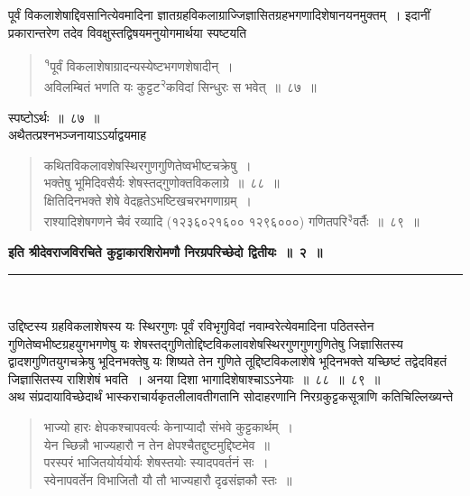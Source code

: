\documentclass[11pt, openany]{book}
\begin{document}
\newpage
\thispagestyle{fancy}
\fancyhf{}
\indent
पूर्वं विकलाशेषाद्दिवसानित्येवमादिना ज्ञातग्रहविकलाग्राज्जिज्ञासितग्रहभगणादिशेषानयनमुक्तम्~। इदानीं प्रकारान्तरेण तदेव विवक्षुस्तद्विषयमनुयोगमार्थया स्पष्टयति\textendash
\begin{quote}
{\ks \textsuperscript{१}पूर्वं विकलाशेषाग्रादन्यस्येष्टभगणशेषादीन्~।\\
अविलम्बितं भणति यः कुट्टट\textsuperscript{२}कविदां सिन्धुरः स भवेत्~॥~८७~॥}
\end{quote}
\indent
स्पष्टोऽर्थः~॥~८७~॥\\
\indent
अथैतत्प्रश्नभञ्जनायाऽऽर्याद्वयमाह\textendash
\begin{quote}
{\ks कथितविकलावशेषस्थिरगुणगुणितेष्वभीष्टचक्रेषु~।\\
भक्तेषु भूमिदिवसैर्यः शेषस्तद्गुणोक्तविकलाग्रे~॥~८८~॥\\
क्षितिदिनभक्ते शेषे वेदहृतेऽभष्टिखचरभगणाग्रम्~।\\
राश्यादिशेषगणने चैवं रव्यादि (१२३६०२१६००\textendash
१२९६०००) गणितपरि\textsuperscript{३}वर्तैः~॥~८९~॥}
\end{quote}
\centering
\textbf{इति श्रीदेवराजविरचिते कुट्टाकारशिरोमणौ निरग्रपरिच्छेदो द्वितीयः~॥~२~॥\\}
\rule{0.2\linewidth}{1.0pt}\\

\vspace{1cm}
\justifying

\indent
उद्दिष्टस्य ग्रहविकलाशेषस्य यः स्थिरगुणः पूर्वं रविभृगुविदां नवाम्वरेत्येवमादिना पठितस्तेन गुणितेष्वभीष्टग्रहयुगभगणेषु यः शेषस्तद्गुणितोद्दिष्टविकलावशेषस्थिरगुणगुणगुणितेषु जिज्ञासितस्य द्वादशगुणितयुगचक्रेषु भूदिनभक्तेषु यः शिष्यते तेन गुणिते तूद्दिष्टविकलाशेषे भूदिनभक्ते यच्छिष्टं तद्वेदविहतं जिज्ञासितस्य राशिशेषं भवति~। अनया दिशा भागादिशेषाश्चाऽऽनेयाः~॥~८८~॥~८९~॥\\
\indent
अथ संप्रदायाविच्छेदार्थं भास्कराचार्यकृतलीलावतीगतानि सोदाहरणानि
निरग्रकुट्टकसूत्राणि कतिचिल्लिख्यन्ते\textendash
\hspace{1cm}
\begin{quote}
{\qt 
भाज्यो हारः क्षेपकश्चापवर्त्यः केनाप्यादौ संभवे कुट्टकार्थम्~।\\
येन च्छिन्नौ भाज्यहारौ न तेन क्षेपश्चैतद्दुष्टमुद्दिष्टमेव~॥\\
परस्परं भाजितयोर्ययोर्यः शेषस्तयोः स्यादपवर्तनं सः~।\\
स्वेनापवर्तेन विभाजितौ यौ तौ भाज्यहारौ दृढसंज्ञकौ स्तः~॥}\\
\end{quote}
\end{document}
